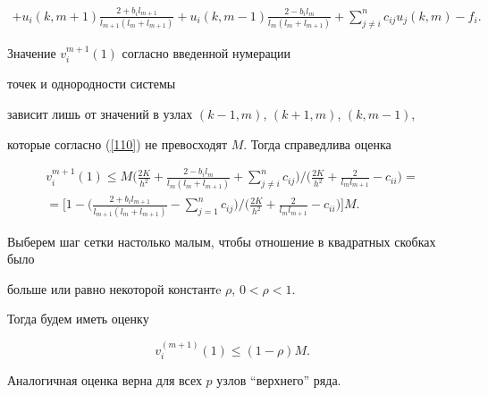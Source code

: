 \begin{pf}
\begin{gather*}
%


+ u_i(k,m+1)\frac{2+b_il_{m+1}}{l_{m+1}(l_m + l_{m+1})}


+ u_i(k,m-1)


\frac{2 - b_il_{m}}{l_{m}(l_m + l_{m+1})} + \sum_{j\ne i}^n


c_{ij}u_j(k,m) - f_i.


\end{gather*}





Значение $v_{i}^{m+1}(1)$ согласно введенной нумерации 


точек и однородности системы


зависит лишь от значений в узлах $(k-1,m)$, $(k+1,m)$, $(k,m-1)$,


которые согласно (\ref{110}) не превосходят $M$. Тогда справедлива оценка


\begin{gather*}


v_{i}^{m+1}(1) \leq M\bigg(\frac{2K}{h^2}


+ \frac{2 - b_il_{m}}{l_{m}(l_m + l_{m+1})} + \sum_{j\ne i}^n


c_{ij} \bigg) \bigg/


\bigg(\frac{2K}{h^2} + \frac{2}{l_ml_{m+1}} - c_{ii} \bigg)=\\


%


=\bigg[1 - \bigg(\frac{2 + b_il_{m+1}}{l_{m+1}(l_m + l_{m+1})} -


\sum_{j=1}^nc_{ij} \bigg) \bigg/


\bigg(\frac{2K}{h^2} + \frac{2}{l_ml_{m+1}} - c_{ii} \bigg)\bigg]M.


\end{gather*}





Выберем шаг сетки настолько малым, чтобы отношение в квадратных скобках было


больше или равно некоторой константe $\rho$, $0<\rho<1$. 


Тогда будем иметь оценку


\begin{equation}\label{112}


v_{i}^{(m+1)}(1) \leq (1 - \rho)M.


\end{equation}





Аналогичная оценка верна для всех $p$ узлов ``верхнего'' ряда.



\end{pf}
